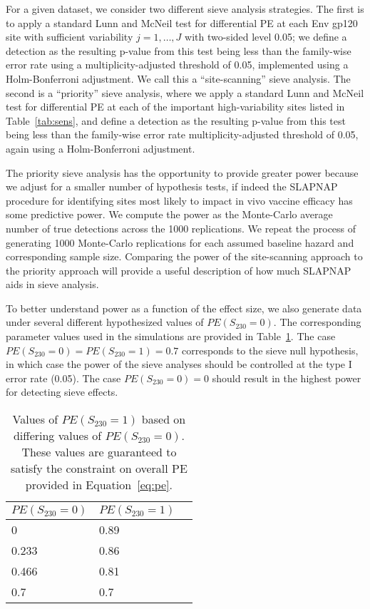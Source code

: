 \documentclass[10pt]{article}
\begin{document}
For a given dataset, we consider two different sieve analysis strategies. The first is to apply a standard Lunn and McNeil test for differential PE at each Env gp120 site with sufficient variability $j = 1, \ldots, J$ with two-sided level 0.05; we define a detection as the resulting p-value from this test being less than the family-wise error rate using a multiplicity-adjusted threshold of 0.05, implemented using a Holm-Bonferroni adjustment. We call this a ``site-scanning'' sieve analysis. The second is a ``priority'' sieve analysis, where we apply a standard Lunn and McNeil test for differential PE at each of the important high-variability sites listed in Table~\ref{tab:sens}, and define a detection as the resulting p-value from this test being less than the family-wise error rate multiplicity-adjusted threshold of 0.05, again using a Holm-Bonferroni adjustment.

The priority sieve analysis has the opportunity to provide greater power because we adjust for a smaller number of hypothesis tests, if indeed the SLAPNAP procedure for identifying sites most likely to impact in vivo vaccine efficacy has some predictive power. We compute the power as the Monte-Carlo average number of true detections across the 1000 replications. We repeat the process of generating 1000 Monte-Carlo replications for each assumed baseline hazard and corresponding sample size. Comparing the power of the site-scanning approach to the priority approach will provide a useful description of how much SLAPNAP aids in sieve analysis.

To better understand power as a function of the effect size, we also generate data under several different hypothesized values of $PE(S_{230} = 0)$. The corresponding parameter values used in the simulations are provided in Table~\ref{tab:effect_size}. The case $PE(S_{230} = 0) = PE(S_{230} = 1) = 0.7$ corresponds to the sieve null hypothesis, in which case the power of the sieve analyses should be controlled at the type I error rate (0.05). The case $PE(S_{230} = 0) = 0$ should result in the highest power for detecting sieve effects.

\begin{table}
  \centering
  \caption{Values of $PE(S_{230} = 1)$ based on differing values of $PE(S_{230} = 0)$. These values are guaranteed to satisfy the constraint on overall PE provided in Equation~\eqref{eq:pe}.}
  \label{tab:effect_size}
  \begin{tabular}{lll}
    $PE(S_{230} = 0)$ & $PE(S_{230} = 1)$ \\
    \hline
    0 & 0.89 \\
    0.233 & 0.86 \\
    0.466 & 0.81\\
    0.7 & 0.7
  \end{tabular}
\end{table}



\end{document}
